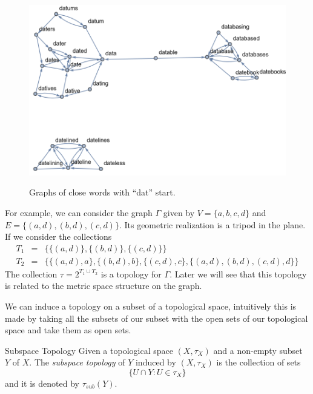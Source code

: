 \documentclass[
	fontsize=10pt, %
	twoside=false, %
	secnumdepth=1, %
]{kaobook}
\begin{document}
\begin{example}
\begin{figure}[h]
\includegraphics[scale=0.5]{Graph_Close_Words.png}
\label{C1:Fig:Wordgraph}
\caption{Graphs of close words with ``dat'' start.}
\end{figure}

For example, we can consider the graph $\Gamma$ given by $V=\{a,b,c,d\}$ and $E=\{(a,d),(b,d),(c,d)\}.$ Its geometric realization is a tripod in the plane. If we consider the collections
\begin{eqnarray*}
T_1 & =& \{\{(a,d)\},\{(b,d)\},\{(c,d)\}\} \\
T_2 & = &\{\{(a,d),a\},\{(b,d),b\},\{(c,d),c\},\{(a,d),(b,d),(c,d),d\}\}
\end{eqnarray*}
The collection $\tau=2^{T_1\cup T_2}$ is a topology for $\Gamma.$ Later we will see that this topology is related to the metric space structure on the graph.
\end{example}

We can induce a topology on a subset of a topological space, intuitively this is made by taking all the subsets of our subset with the open sets of our topological space and take them as open sets.

\begin{definition}{Subspace Topology}
Given a topological space $(X,\tau_X)$ and a non-empty subset $Y$ of $X.$ The \emph{subspace topology} of $Y$ induced by $(X,\tau_X)$ is the collection of sets $$\{U\cap Y: U\in \tau_X\}$$ and it is denoted by $\tau_{sub}(Y).$
\end{definition}
\end{document}
